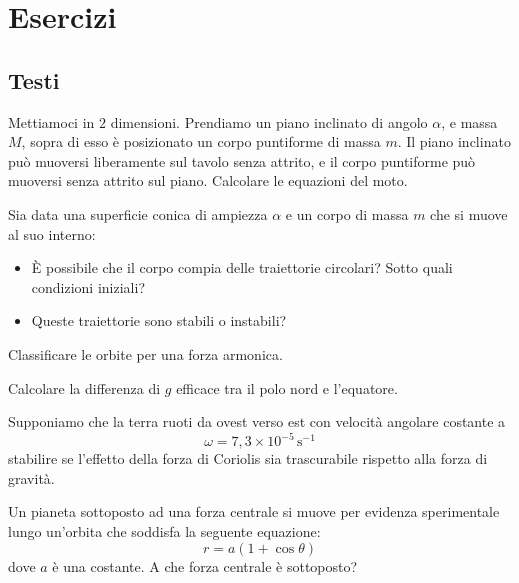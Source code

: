 \documentclass[11pt]{scrartcl}
\begin{document}
	\newpage
	
	\section{Esercizi}
	
	\subsection{Testi}
	
	\begin{problem}
		Mettiamoci in $2$ dimensioni. Prendiamo un piano inclinato di angolo $\alpha$,  e massa $M$, sopra di esso è posizionato un corpo puntiforme di massa $m$. Il piano inclinato può muoversi liberamente sul tavolo senza attrito, e il corpo puntiforme può muoversi senza attrito sul piano. Calcolare le equazioni del moto.
	\end{problem}
	\begin{problem}
		Sia data una superficie conica  di ampiezza $\alpha$ e un corpo di massa $m$ che si muove al suo interno:
		\begin{itemize}
			\item \`E possibile che il corpo compia delle traiettorie circolari? Sotto quali condizioni iniziali?
			\item Queste traiettorie sono stabili o instabili?
		\end{itemize}
	\end{problem}
	\begin{problem}
		Classificare le orbite per una forza armonica. 
	\end{problem}
	\begin{problem}
		Calcolare la differenza di $g$ efficace tra il polo nord e l'equatore.
	\end{problem}
	\begin{problem}
		Supponiamo che la terra ruoti da ovest verso est con velocità angolare costante a  $$\omega=7,3\times 10^{-5} \,\text{s}^{-1}$$
		stabilire se l'effetto della forza di Coriolis sia trascurabile rispetto alla forza di gravità.
	\end{problem}
	\begin{problem}
		Un pianeta sottoposto ad una forza centrale si muove per evidenza sperimentale lungo un'orbita che soddisfa la seguente equazione:
		$$r=a(1+\cos\theta)$$
		dove $a$ è una costante. A che forza centrale è sottoposto?
	\end{problem}
\end{document}
